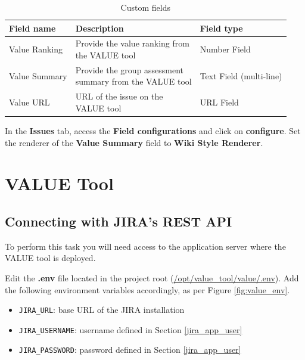 \documentclass{article}
\begin{document}
\begin{table}[!ht]
    \renewcommand{\arraystretch}{2}
    \centering
    \begin{tabular}{lll}
    \hline
    \textbf{Field name} & \textbf{Description} & \textbf{Field type}\\
    \hline
    Value Ranking & \makecell[l]{Provide the value ranking from\\the VALUE tool} & Number Field\\

    Value Summary & \makecell[l]{Provide the group assessment\\summary from the VALUE tool} & Text Field (multi-line)\\

    Value URL & \makecell[l]{URL of the issue on the\\VALUE tool} & URL Field\\
    \hline
    \end{tabular}
    \caption{Custom fields}
    \label{tbl:custom_fields}
\end{table}

In the \textbf{Issues} tab, access the \textbf{Field configurations} and click on \textbf{configure}. Set the renderer of the \textbf{Value Summary} field to \textbf{Wiki Style Renderer}.


\section{VALUE Tool}
\label{value}
\subsection{Connecting with JIRA's REST API}
To perform this task you will need access to the application server where the VALUE tool is deployed.

Edit the \textbf{.env} file located in the project root (\url{/opt/value_tool/value/.env}). Add the following environment variables accordingly, as per Figure \ref{fig:value_env}.

\begin{itemize}
    \item \texttt{JIRA\_URL}: base URL of the JIRA installation
    \item \texttt{JIRA\_USERNAME}: username defined in Section \ref{jira_app_user}
    \item \texttt{JIRA\_PASSWORD}: password defined in Section \ref{jira_app_user}
\end{itemize}
\end{document}
